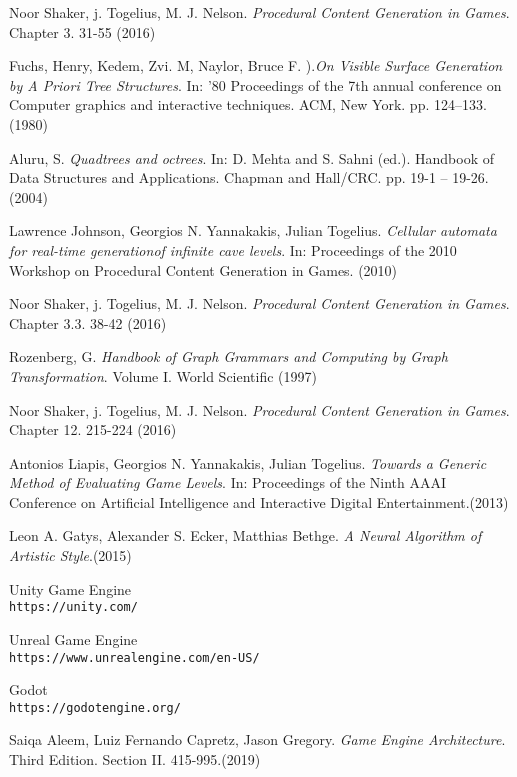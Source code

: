 \begin{thebibliography}{9}
 Noor Shaker, j. Togelius, M. J. Nelson. \textit{Procedural Content Generation in Games}. Chapter 3. 31-55 (2016)

 Fuchs, Henry, Kedem, Zvi. M, Naylor, Bruce F. ).\textit{On Visible Surface Generation by A Priori Tree Structures}. In: '80 Proceedings of the 7th annual conference on Computer graphics and interactive techniques. ACM, New York. pp. 124–133. (1980)

 Aluru, S. \textit{Quadtrees and octrees}. In: D. Mehta and S. Sahni (ed.). Handbook of Data Structures and Applications. Chapman and Hall/CRC. pp. 19-1 -- 19-26. (2004)

 Lawrence Johnson, Georgios N. Yannakakis, Julian Togelius. \textit{Cellular automata for real-time generationof infinite cave levels}. In: Proceedings of the 2010 Workshop on Procedural Content Generation in Games. (2010)

 Noor Shaker, j. Togelius, M. J. Nelson. \textit{Procedural Content Generation in Games}. Chapter 3.3. 38-42 (2016)

 Rozenberg, G. \textit{Handbook of Graph Grammars and Computing by Graph Transformation}. Volume I. World Scientific (1997)

 Noor Shaker, j. Togelius, M. J. Nelson. \textit{Procedural Content Generation in Games}. Chapter 12. 215-224 (2016)

 Antonios Liapis, Georgios N. Yannakakis, Julian Togelius. \textit{Towards a Generic Method of Evaluating Game Levels}. In:  Proceedings of the Ninth AAAI Conference on Artificial Intelligence and Interactive Digital Entertainment.(2013)

 Leon A. Gatys, Alexander S. Ecker, Matthias Bethge. \textit{A Neural Algorithm of Artistic Style}.(2015)

 Unity Game Engine \\
\texttt{https://unity.com/}

 Unreal Game Engine \\
\texttt{https://www.unrealengine.com/en-US/}

 Godot \\
\texttt{https://godotengine.org/}

 Saiqa Aleem, Luiz Fernando Capretz, Jason Gregory. \textit{Game Engine Architecture}. Third Edition. Section II. 415-995.(2019)


\end{thebibliography}
